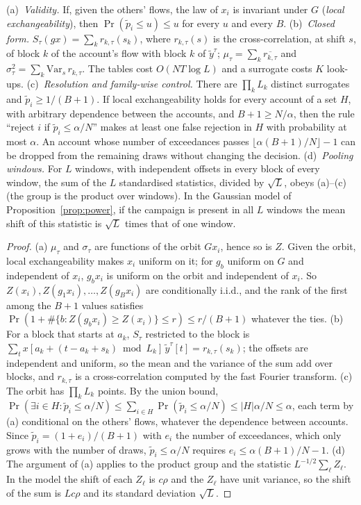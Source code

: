 \begin{proposition}\label{prop:jitter}
(a)~\emph{Validity.} If, given the others' flows, the law of $x_i$ is invariant under $G$ (\emph{local exchangeability}), then $\Pr(\tilde p_i\le u)\le u$ for every $u$ and every $B$.
(b)~\emph{Closed form.} $S_\tau(gx)=\sum_k r_{k,\tau}(s_k)$, where $r_{k,\tau}(s)$ is the cross-correlation, at shift $s$, of block $k$ of the account's flow with block $k$ of $\tilde y^\tau$; $\mu_\tau=\sum_k\overline{r_{k,\tau}}$ and $\sigma_\tau^2=\sum_k\mathrm{Var}_s\,r_{k,\tau}$. The tables cost $O(NT\log L)$ and a surrogate costs $K$ look-ups.
(c)~\emph{Resolution and family-wise control.} There are $\prod_kL_k$ distinct surrogates and $\tilde p_i\ge1/(B+1)$. If local exchangeability holds for every account of a set $H$, with arbitrary dependence between the accounts, and $B+1\ge N/\alpha$, then the rule ``reject $i$ if $\tilde p_i\le\alpha/N$'' makes at least one false rejection in $H$ with probability at most $\alpha$. An account whose number of exceedances passes $\lfloor\alpha(B+1)/N\rfloor-1$ can be dropped from the remaining draws without changing the decision.
(d)~\emph{Pooling windows.} For $L$ windows, with independent offsets in every block of every window, the sum of the $L$ standardised statistics, divided by $\sqrt L$, obeys (a)--(c) (the group is the product over windows). In the Gaussian model of Proposition~\ref{prop:power}, if the campaign is present in all $L$ windows the mean shift of this statistic is $\sqrt L$ times that of one window.
\end{proposition}
\begin{proof}
(a) $\mu_\tau$ and $\sigma_\tau$ are functions of the orbit $Gx_i$, hence so is $Z$. Given the orbit, local exchangeability makes $x_i$ uniform on it; for $g_b$ uniform on $G$ and independent of $x_i$, $g_bx_i$ is uniform on the orbit and independent of $x_i$. So $Z(x_i),Z(g_1x_i),\dots,Z(g_Bx_i)$ are conditionally i.i.d., and the rank of the first among the $B+1$ values satisfies $\Pr(1+\#\{b:Z(g_bx_i)\ge Z(x_i)\}\le r)\le r/(B+1)$ whatever the ties.
(b) For a block that starts at $a_k$, $S_\tau$ restricted to the block is $\sum_t x[a_k+(t-a_k+s_k)\bmod L_k]\,\tilde y^\tau[t]=r_{k,\tau}(s_k)$; the offsets are independent and uniform, so the mean and the variance of the sum add over blocks, and $r_{k,\tau}$ is a cross-correlation computed by the fast Fourier transform.
(c) The orbit has $\prod_kL_k$ points. By the union bound, $\Pr(\exists i\in H:\tilde p_i\le\alpha/N)\le\sum_{i\in H}\Pr(\tilde p_i\le\alpha/N)\le|H|\alpha/N\le\alpha$, each term by (a) conditional on the others' flows, whatever the dependence between accounts. Since $\tilde p_i=(1+e_i)/(B+1)$ with $e_i$ the number of exceedances, which only grows with the number of draws, $\tilde p_i\le\alpha/N$ requires $e_i\le\alpha(B+1)/N-1$.
(d) The argument of (a) applies to the product group and the statistic $L^{-1/2}\sum_\ell Z_\ell$. In the model the shift of each $Z_\ell$ is $c\rho$ and the $Z_\ell$ have unit variance, so the shift of the sum is $Lc\rho$ and its standard deviation $\sqrt L$. \qedhere
\end{proof}

